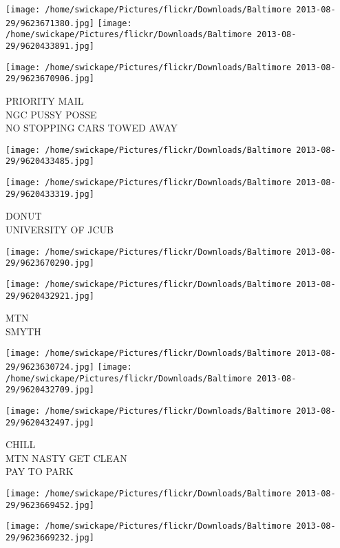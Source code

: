 \documentclass[10pt,letterpaper]{article}
\begin{document}
\texttt{[image: /home/swickape/Pictures/flickr/Downloads/Baltimore 2013-08-29/9623671380.jpg]}
\texttt{[image: /home/swickape/Pictures/flickr/Downloads/Baltimore 2013-08-29/9620433891.jpg]}

\texttt{[image: /home/swickape/Pictures/flickr/Downloads/Baltimore 2013-08-29/9623670906.jpg]}

PRIORITY MAIL\\
NGC PUSSY POSSE\\
NO STOPPING CARS TOWED AWAY\\
\pagebreak

\texttt{[image: /home/swickape/Pictures/flickr/Downloads/Baltimore 2013-08-29/9620433485.jpg]}

\vspace{0.25in}
\texttt{[image: /home/swickape/Pictures/flickr/Downloads/Baltimore 2013-08-29/9620433319.jpg]}

DONUT\\
UNIVERSITY OF JCUB\\
\pagebreak

\texttt{[image: /home/swickape/Pictures/flickr/Downloads/Baltimore 2013-08-29/9623670290.jpg]}

\vspace{0.25in}
\texttt{[image: /home/swickape/Pictures/flickr/Downloads/Baltimore 2013-08-29/9620432921.jpg]}

MTN\\
SMYTH\\
\pagebreak

\texttt{[image: /home/swickape/Pictures/flickr/Downloads/Baltimore 2013-08-29/9623630724.jpg]}
\texttt{[image: /home/swickape/Pictures/flickr/Downloads/Baltimore 2013-08-29/9620432709.jpg]}

\texttt{[image: /home/swickape/Pictures/flickr/Downloads/Baltimore 2013-08-29/9620432497.jpg]}

CHILL\\
MTN NASTY GET CLEAN\\
PAY TO PARK\\
\pagebreak

\texttt{[image: /home/swickape/Pictures/flickr/Downloads/Baltimore 2013-08-29/9623669452.jpg]}

\vspace{0.25in}
\texttt{[image: /home/swickape/Pictures/flickr/Downloads/Baltimore 2013-08-29/9623669232.jpg]}
\end{document}
